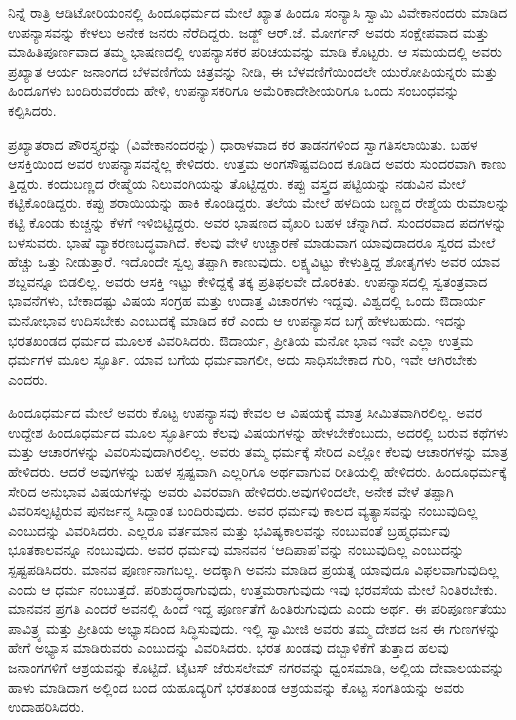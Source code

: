 ನಿನ್ನೆ ರಾತ್ರಿ ಆಡಿಟೋರಿಯಂನಲ್ಲಿ ಹಿಂದೂಧರ್ಮದ ಮೇಲೆ ಖ್ಯಾತ ಹಿಂದೂ ಸಂನ್ಯಾಸಿ ಸ್ವಾಮಿ ವಿವೇಕಾನಂದರು ಮಾಡಿದ ಉಪನ್ಯಾಸವನ್ನು ಕೇಳಲು ಅನೇಕ ಜನರು ನೆರೆದಿದ್ದರು. ಜಡ್ಜ್​ ಆರ್​.ಜೆ. ಮೋರ್ಗನ್​ ಅವರು ಸಂಕ್ಷೇಪವಾದ ಮತ್ತು ಮಾಹಿತಿಪೂರ್ಣವಾದ ತಮ್ಮ ಭಾಷಣದಲ್ಲಿ ಉಪನ್ಯಾಸಕರ ಪರಿಚಯವನ್ನು ಮಾಡಿ ಕೊಟ್ಟರು. ಆ ಸಮಯದಲ್ಲಿ ಅವರು ಪ್ರಖ್ಯಾತ ಆರ್ಯ ಜನಾಂಗದ ಬೆಳವಣಿಗೆಯ ಚಿತ್ರವನ್ನು ನೀಡಿ, ಈ ಬೆಳವಣಿಗೆಯಿಂದಲೇ ಯುರೋಪಿಯನ್ನರು ಮತ್ತು ಹಿಂದೂಗಳು ಬಂದಿರುವರೆಂದು ಹೇಳಿ, ಉಪನ್ಯಾಸಕರಿಗೂ ಅಮೆರಿಕಾದೇಶೀಯರಿಗೂ ಒಂದು ಸಂಬಂಧವನ್ನು ಕಲ್ಪಿಸಿದರು.

ಪ್ರಖ್ಯಾತರಾದ ಪೌರಸ್ತ್ಯರನ್ನು (ವಿವೇಕಾನಂದರನ್ನು) ಧಾರಾಳವಾದ ಕರ ತಾಡನಗಳಿಂದ ಸ್ವಾಗತಿಸಲಾಯಿತು. ಬಹಳ ಆಸಕ್ತಿಯಿಂದ ಅವರ ಉಪನ್ಯಾಸವನ್ನೆಲ್ಲ ಕೇಳಿದರು. ಉತ್ತಮ ಅಂಗಸೌಷ್ಟವದಿಂದ ಕೂಡಿದ ಅವರು ಸುಂದರವಾಗಿ ಕಾಣು ತ್ತಿದ್ದರು. ಕಂದುಬಣ್ಣದ ರೇಷ್ಮೆಯ ನಿಲುವಂಗಿಯನ್ನು ತೊಟ್ಟಿದ್ದರು. ಕಪ್ಪು ವಸ್ತ್ರದ ಪಟ್ಟಿಯನ್ನು ನಡುವಿನ ಮೇಲೆ ಕಟ್ಟಿಕೊಂಡಿದ್ದರು. ಕಪ್ಪು ಶರಾಯಿಯನ್ನು ಹಾಕಿ ಕೊಂಡಿದ್ದರು. ತಲೆಯ ಮೇಲೆ ಹಳದಿಯ ಬಣ್ಣದ ರೇಶ್ಮೆಯ ರುಮಾಲನ್ನು ಕಟ್ಟಿ ಕೊಂಡು ಕುಚ್ಚನ್ನು ಕೆಳಗೆ ಇಳಿಬಿಟ್ಟಿದ್ದರು. ಅವರ ಭಾಷಣದ ವೈಖರಿ ಬಹಳ ಚೆನ್ನಾಗಿದೆ. ಸುಂದರವಾದ ಪದಗಳನ್ನು ಬಳಸುವರು. ಭಾಷೆ ವ್ಯಾಕರಣಬದ್ಧವಾಗಿದೆ. ಕೆಲವು ವೇಳೆ ಉಚ್ಚಾರಣೆ ಮಾಡುವಾಗ ಯಾವುದಾದರೂ ಸ್ವರದ ಮೇಲೆ ಹೆಚ್ಚು ಒತ್ತು ನೀಡುತ್ತಾರೆ. ಇದೊಂದೇ ಸ್ವಲ್ಪ ತಪ್ಪಾಗಿ ಕಾಣುವುದು. ಲಕ್ಷ್ಯವಿಟ್ಟು ಕೇಳುತ್ತಿದ್ದ ಶೋತೃಗಳು ಅವರ ಯಾವ ಶಬ್ದವನ್ನೂ ಬಿಡಲಿಲ್ಲ. ಅವರು ಆಸಕ್ತಿ ಇಟ್ಟು ಕೇಳಿದ್ದಕ್ಕೆ ತಕ್ಕ ಪ್ರತಿಫಲವೇ ದೊರಕಿತು. ಉಪನ್ಯಾಸದಲ್ಲಿ ಸ್ವತಂತ್ರವಾದ ಭಾವನೆಗಳು, ಬೇಕಾದಷ್ಟು ವಿಷಯ ಸಂಗ್ರಹ ಮತ್ತು ಉದಾತ್ತ ವಿಚಾರಗಳು ಇದ್ದವು. ವಿಶ್ವದಲ್ಲಿ ಒಂದು ಔದಾರ್ಯ ಮನೋಭಾವ ಉದಿಸಬೇಕು ಎಂಬುದಕ್ಕೆ ಮಾಡಿದ ಕರೆ ಎಂದು ಆ ಉಪನ್ಯಾಸದ ಬಗ್ಗೆ ಹೇಳಬಹುದು. ಇದನ್ನು ಭರತಖಂಡದ ಧರ್ಮದ ಮೂಲಕ ವಿವರಿಸಿದರು. ಔದಾರ್ಯ, ಪ್ರೀತಿಯ ಮನೋ ಭಾವ ಇವೇ ಎಲ್ಲಾ ಉತ್ತಮ ಧರ್ಮಗಳ ಮೂಲ ಸ್ಫೂರ್ತಿ. ಯಾವ ಬಗೆಯ ಧರ್ಮವಾಗಲೀ, ಅದು ಸಾಧಿಸಬೇಕಾದ ಗುರಿ, ಇವೇ ಆಗಿರಬೇಕು ಎಂದರು.

ಹಿಂದೂಧರ್ಮದ ಮೇಲೆ ಅವರು ಕೊಟ್ಟ ಉಪನ್ಯಾಸವು ಕೇವಲ ಆ ವಿಷಯಕ್ಕೆ ಮಾತ್ರ ಸೀಮಿತವಾಗಿರಲಿಲ್ಲ. ಅವರ ಉದ್ದೇಶ ಹಿಂದೂಧರ್ಮದ ಮೂಲ ಸ್ಫೂರ್ತಿಯ ಕೆಲವು ವಿಷಯಗಳನ್ನು ಹೇಳಬೇಕೆಂಬುದು, ಅದರಲ್ಲಿ ಬರುವ ಕಥೆಗಳು ಮತ್ತು ಆಚಾರಗಳನ್ನು ವಿವರಿಸುವುದಾಗಿರಲಿಲ್ಲ. ಅವರು ತಮ್ಮ ಧರ್ಮಕ್ಕೆ ಸೇರಿದ ಎಲ್ಲೋ ಕೆಲವು ಆಚಾರಗಳನ್ನು ಮಾತ್ರ ಹೇಳಿದರು. ಆದರೆ ಅವುಗಳನ್ನು ಬಹಳ ಸ್ಪಷ್ಟವಾಗಿ ಎಲ್ಲರಿಗೂ ಅರ್ಥವಾಗುವ ರೀತಿಯಲ್ಲಿ ಹೇಳಿದರು. ಹಿಂದೂಧರ್ಮಕ್ಕೆ ಸೇರಿದ ಅನುಭಾವ ವಿಷಯಗಳನ್ನು ಅವರು ವಿವರವಾಗಿ ಹೇಳಿದರು.ಅವುಗಳಿಂದಲೇ, ಅನೇಕ ವೇಳೆ ತಪ್ಪಾಗಿ ವಿವರಿಸಲ್ಪಟ್ಟಿರುವ ಪುನರ್ಜನ್ಮ ಸಿದ್ದಾಂತ ಬಂದಿರುವುದು. ಅವರ ಧರ್ಮವು ಕಾಲದ ವ್ಯತ್ಯಾಸವನ್ನು ನಂಬುವುದಿಲ್ಲ ಎಂಬುದನ್ನು ವಿವರಿಸಿದರು. ಎಲ್ಲರೂ ವರ್ತಮಾನ ಮತ್ತು ಭವಿಷ್ಯಕಾಲವನ್ನು ನಂಬುವಂತೆ ಬ್ರಹ್ಮಧರ್ಮವು ಭೂತಕಾಲವನ್ನೂ ನಂಬುವುದು. ಅವರ ಧರ್ಮವು ಮಾನವನ ‘ಆದಿಪಾಪ’ವನ್ನು ನಂಬುವುದಿಲ್ಲ ಎಂಬುದನ್ನು ಸ್ಪಷ್ಟಪಡಿಸಿದರು. ಮಾನವ ಪೂರ್ಣನಾಗ\break ಬಲ್ಲ. ಅದಕ್ಕಾಗಿ ಅವನು ಮಾಡಿದ ಪ್ರಯತ್ನ ಯಾವುದೂ ವಿಫಲವಾಗುವುದಿಲ್ಲ ಎಂದು ಆ ಧರ್ಮ ನಂಬುತ್ತದೆ. ಪರಿಶುದ್ಧರಾಗುವುದು, ಉತ್ತಮರಾಗುವುದು ಇವು ಭರವಸೆಯ ಮೇಲೆ ನಿಂತಿರಬೇಕು. ಮಾನವನ ಪ್ರಗತಿ ಎಂದರೆ ಅವನಲ್ಲಿ ಹಿಂದೆ ಇದ್ದ ಪೂರ್ಣತೆಗೆ ಹಿಂತಿರುಗುವುದು ಎಂದು ಅರ್ಥ. ಈ ಪರಿಪೂರ್ಣತೆಯು ಪಾವಿತ್ರ್ಯ ಮತ್ತು ಪ್ರೀತಿಯ ಅಭ್ಯಾಸದಿಂದ ಸಿದ್ಧಿಸುವುದು. ಇಲ್ಲಿ ಸ್ವಾಮೀಜಿ ಅವರು ತಮ್ಮ ದೇಶದ ಜನ ಈ ಗುಣಗಳನ್ನು ಹೇಗೆ ಅಭ್ಯಾಸ ಮಾಡಿರುವರು ಎಂಬುದನ್ನು ವಿವರಿಸಿದರು. ಭರತ ಖಂಡವು ದಬ್ಬಾಳಿಕೆಗೆ ತುತ್ತಾದ ಹಲವು ಜನಾಂಗಗಳಿಗೆ ಆಶ್ರಯವನ್ನು ಕೊಟ್ಟಿದೆ. ಟೈಟಸ್​ ಜೆರುಸಲೇಮ್​ ನಗರವನ್ನು ಧ್ವಂಸಮಾಡಿ, ಅಲ್ಲಿಯ ದೇವಾಲಯವನ್ನು ಹಾಳು ಮಾಡಿದಾಗ ಅಲ್ಲಿಂದ ಬಂದ ಯಹೂದ್ಯರಿಗೆ ಭರತಖಂಡ ಆಶ್ರಯವನ್ನು ಕೊಟ್ಟ ಸಂಗತಿಯನ್ನು ಅವರು ಉದಾಹರಿಸಿ\break ದರು.

